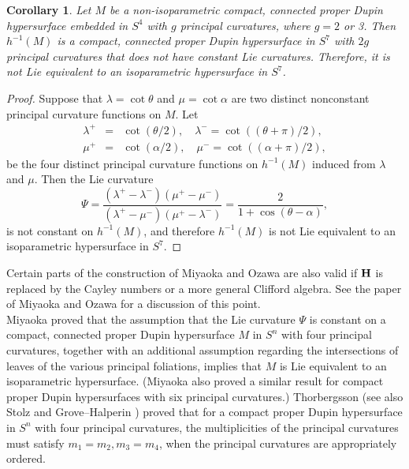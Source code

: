 \documentclass[12pt]{article}
\newtheorem{corollary}{Corollary}[section]
\begin{document}
\begin{corollary}
\label{cor:3.7.4} 
Let $M$ be a non-isoparametric compact, connected proper Dupin hypersurface embedded in $S^4$ with $g$ principal 
curvatures, where $g= 2$ or 3.  Then $h^{-1}(M)$ is a compact, connected proper Dupin hypersurface in $S^7$
with $2g$ principal curvatures that does not have constant Lie curvatures.  Therefore, it is not Lie equivalent to an isoparametric hypersurface in $S^7$.
\end{corollary}
\begin{proof}
Suppose that $\lambda = \cot \theta$ and $\mu = \cot \alpha$ are two distinct nonconstant principal curvature
functions on $M$.  Let
\begin{eqnarray}
\lambda^{+} & = & \cot (\theta / 2), \quad \lambda^{-} = \cot ((\theta + \pi) / 2), \nonumber \\
\mu^{+} & = & \cot (\alpha / 2), \quad \mu^{-} = \cot ((\alpha + \pi) / 2), \nonumber
\end{eqnarray}
be the four distinct principal curvature functions on $h^{-1}(M)$ induced from $\lambda$ and $\mu$.  Then the Lie curvature
\begin{displaymath}
\Psi = \frac{(\lambda^{+} - \lambda^{-})(\mu^{+} - \mu^{-})}{(\lambda^{+} - \mu^{-})(\mu^{+} - \lambda^{-})}
= \frac{2}{1 + \cos (\theta - \alpha)}, 
\end{displaymath}
is not constant on $h^{-1}(M)$, and therefore $h^{-1}(M)$ is not Lie equivalent to an isoparametric hypersurface
in $S^7$. 
\end{proof}

Certain parts of the construction of Miyaoka and Ozawa
are also valid if ${\bf H}$ is replaced by the Cayley
numbers
or a more general Clifford algebra.  
See the paper of Miyaoka and Ozawa  \cite{MO} for a discussion of this point.\\

Miyaoka \cite{Mi3} proved that the assumption that the Lie curvature $\Psi$ is constant on a 
compact, connected proper Dupin hypersurface $M$ in $S^n$ with four principal curvatures, 
together with an additional assumption regarding the intersections
of leaves of the various principal foliations, implies that $M$ is Lie equivalent to an isoparametric
hypersurface.  (Miyaoka \cite{Mi4} also proved a similar result for compact proper Dupin hypersurfaces with six principal 
curvatures.) 
Thorbergsson\cite{Th1} (see also Stolz \cite{Stolz}
and Grove--Halperin \cite{GH}) proved
that for a compact proper Dupin hypersurface 
in $S^n$ with four principal curvatures, 
the multiplicities
of the principal curvatures must satisfy $m_1 = m_2, m_3 = m_4$, when the principal
curvatures are appropriately ordered.
\end{document}
